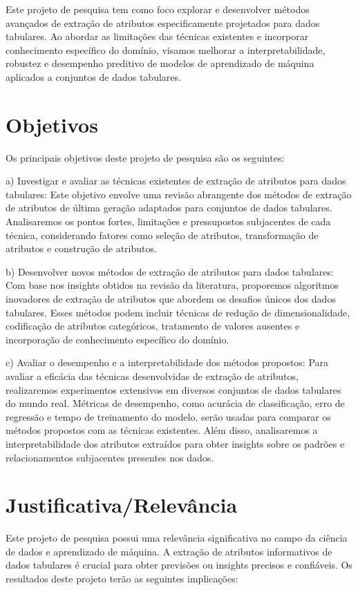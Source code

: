 \documentclass{article}
\begin{document}
Este projeto de pesquisa tem como foco explorar e desenvolver métodos avançados de extração de atributos especificamente projetados para dados tabulares. Ao abordar as limitações das técnicas existentes e incorporar conhecimento específico do domínio, visamos melhorar a interpretabilidade, robustez e desempenho preditivo de modelos de aprendizado de máquina aplicados a conjuntos de dados tabulares.
   
\section{Objetivos}

Os principais objetivos deste projeto de pesquisa são os seguintes:

a) Investigar e avaliar as técnicas existentes de extração de atributos para dados tabulares: Este objetivo envolve uma revisão abrangente dos métodos de extração de atributos de última geração adaptados para conjuntos de dados tabulares. Analisaremos os pontos fortes, limitações e pressupostos subjacentes de cada técnica, considerando fatores como seleção de atributos, transformação de atributos e construção de atributos.

b) Desenvolver novos métodos de extração de atributos para dados tabulares: Com base nos insights obtidos na revisão da literatura, proporemos algoritmos inovadores de extração de atributos que abordem os desafios únicos dos dados tabulares. Esses métodos podem incluir técnicas de redução de dimensionalidade, codificação de atributos categóricos, tratamento de valores ausentes e incorporação de conhecimento específico do domínio.

c) Avaliar o desempenho e a interpretabilidade dos métodos propostos: Para avaliar a eficácia das técnicas desenvolvidas de extração de atributos, realizaremos experimentos extensivos em diversos conjuntos de dados tabulares do mundo real. Métricas de desempenho, como acurácia de classificação, erro de regressão e tempo de treinamento do modelo, serão usadas para comparar os métodos propostos com as técnicas existentes. Além disso, analisaremos a interpretabilidade dos atributos extraídos para obter insights sobre os padrões e relacionamentos subjacentes presentes nos dados.
   
\section{Justificativa/Relevância}

Este projeto de pesquisa possui uma relevância significativa no campo da ciência de dados e aprendizado de máquina. A extração de atributos informativos de dados tabulares é crucial para obter previsões ou insights precisos e confiáveis. Os resultados deste projeto terão as seguintes implicações:
\end{document}
